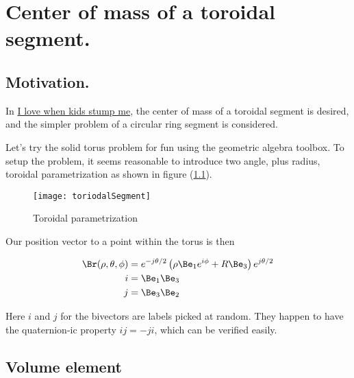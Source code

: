 %


\chapter{Center of mass of a toroidal segment.}
\label{chap:torusCenterOfMass}
{}
\date{May 15, 2010}

\beginArtNoToc

\section{Motivation.}

In \href{http://samjshah.com/2010/05/05/i-love-when-kids-stump-me/}{I love when kids stump me}, the center of mass of a toroidal segment is desired, and the simpler problem of a circular ring segment is considered.

Let's try the solid torus problem for fun using the geometric algebra toolbox.  To setup the problem, it seems reasonable to introduce two angle, plus radius, toroidal parametrization as shown in figure (\ref{fig:toriodalSegment}).

\begin{figure}[htp]
\centering
\texttt{[image: toriodalSegment]}
\caption{Toroidal parametrization}\label{fig:toriodalSegment}
\end{figure}

Our position vector to a point within the torus is then

\begin{subequations}
\begin{align}\label{eqn:torusCenterOfMass:1}
\Br(\rho, \theta, \phi) &= e^{-j\theta/2} \left( \rho \Be_1 e^{ i \phi } + R \Be_3 \right) e^{j \theta/2} \\
i &= \Be_1 \Be_3 \\
j &= \Be_3 \Be_2 
\end{align}
\end{subequations}

Here $i$ and $j$ for the bivectors are labels picked at random.  They happen to have the quaternion-ic property $i j = -j i$, which can be verified easily.

\section{Volume element}

